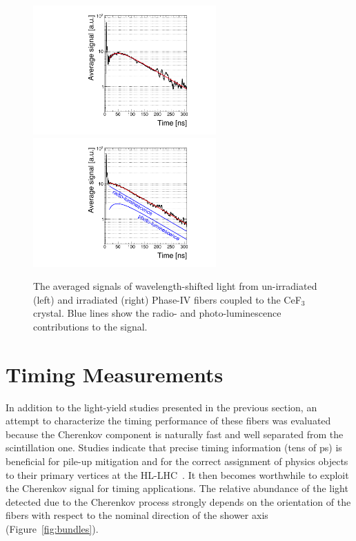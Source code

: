 \documentclass[a4paper,11pt]{article}
\begin{document}
\begin{figure}[ht]
\begin{center}
        \includegraphics[width=7cm]{Figures/CeF3coupledFibersUnirrad.pdf}
        \includegraphics[width=7cm]{Figures/CeF3coupledFibersIrrad.pdf}
    \caption{\small The averaged signals of wavelength-shifted light from un-irradiated (left) and irradiated (right) Phase-IV fibers coupled to the CeF$_3$ crystal. Blue lines show the radio- and photo-luminescence contributions to the signal. }
    \label{fig:CeF3signals}
\end{center}
\end{figure}

\section{Timing Measurements}
\label{sec:timing}
In addition to the light-yield studies presented in the previous section, an attempt to characterize the timing performance of these fibers was evaluated because the Cherenkov component is naturally fast and well separated from the scintillation one. Studies indicate that precise timing information (tens of ps) is beneficial for pile-up mitigation and for the correct assignment of physics objects to their primary vertices at the HL-LHC~\cite{r-timingATLAS,r-timingCMS}. It then becomes worthwhile to exploit the Cherenkov signal for timing applications.  The relative abundance of the light detected due to the Cherenkov process  strongly depends on the orientation of the fibers with respect to the nominal direction of the shower axis (Figure~\ref{fig:bundles}). 
\end{document}
